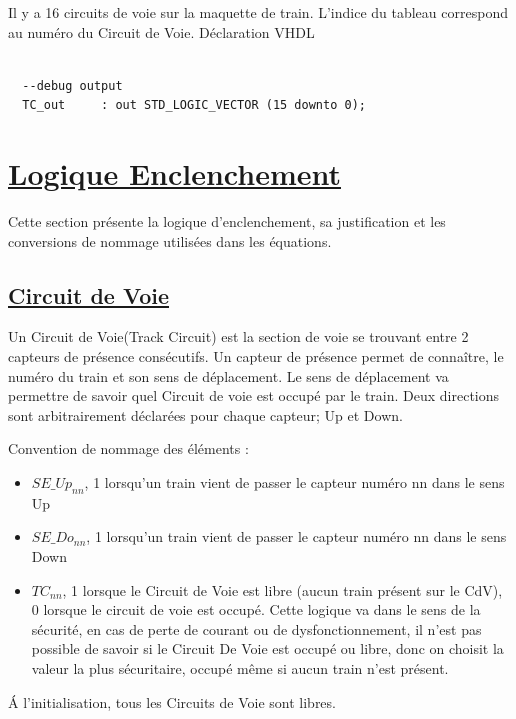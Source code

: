 Il y a 16 circuits de voie sur la maquette de train. L'indice du
tableau correspond au numéro du Circuit de Voie.
\medskip
\medskip
Déclaration VHDL
\begin{lstlisting}[style=vhdl]

  --debug output
  TC_out     : out STD_LOGIC_VECTOR (15 downto 0);

\end{lstlisting}

\newpage

\section{\underline{Logique Enclenchement}}
\label{sec:log_enc}

Cette section présente la logique d'enclenchement, sa justification et
les conversions de nommage utilisées dans les équations.

\subsection{\underline{Circuit de Voie}}
\label{sec:CdV}

Un Circuit de Voie(Track Circuit) est la section de voie se trouvant entre 2 capteurs
de présence consécutifs. Un capteur de présence permet de
connaître, le numéro du train et son sens de déplacement. Le sens de
déplacement va permettre de savoir quel Circuit de voie est occupé par le
train. Deux directions sont arbitrairement déclarées pour chaque
capteur; Up et Down.

Convention de nommage des éléments :
\begin{itemize}
\item $SE\_Up_{nn}$, 1 lorsqu'un train vient de passer le capteur numéro
  nn dans le sens Up
\item $SE\_Do_{nn}$, 1 lorsqu'un train vient de passer le capteur numéro
  nn dans le sens Down
\item $TC_{nn}$, 1 lorsque le Circuit de Voie est libre (aucun train
  présent sur le CdV), 0 lorsque le circuit de voie est occupé. Cette
  logique va dans le sens de la sécurité, en cas de perte de courant
  ou de dysfonctionnement, il n'est pas possible de savoir si le
  Circuit De Voie est occupé ou libre, donc on choisit la valeur la
  plus sécuritaire, occupé même si aucun train n'est présent.
\end{itemize}

\'A l'initialisation, tous les Circuits de Voie sont libres.

